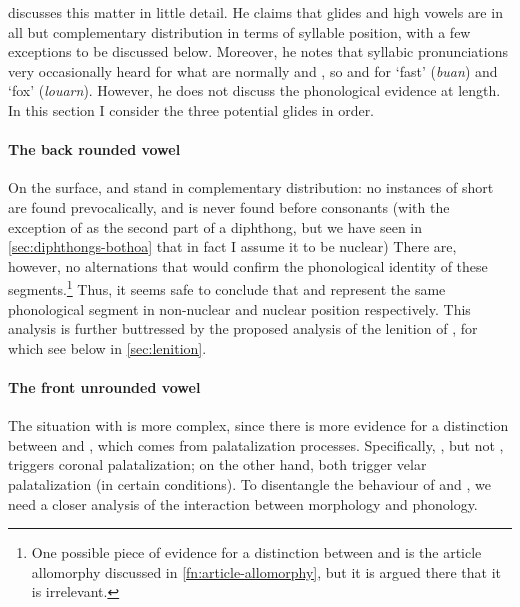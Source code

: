 \citet[p.~166]{humphreys95:_phonol_bothoa_saint_nicol_pelem} discusses this matter in little detail. He claims that glides and high vowels are in all but complementary distribution in terms of syllable position, with a few exceptions to be discussed below. Moreover, he notes that syllabic pronunciations very occasionally heard for what are normally \ipa{[w]} and \ipa{[j]}, so  and  for \ipa{[ˈbjɔ̃ːn]} `fast' (\emph{buan}) and \ipa{[ˈlwarn]} `fox' (\emph{louarn}). However, he does not discuss the phonological evidence at length. In this section I consider the three potential glides in order.

\paragraph{The back rounded vowel}
\label{sec:back-rounded-vowel}

On the surface, \ipa{[w]} and \ipa{[u]} stand in complementary distribution: no instances of short \ipa{[u]} are found prevocalically, and \ipa{[w]} is never found before consonants (with the exception of \ipa{[w]} as the second part of a diphthong, but we have seen in \cref{sec:diphthongs-bothoa} that in fact I assume it to be nuclear) There are, however, no alternations that would confirm the phonological identity of these segments.\footnote{One possible piece of evidence for a distinction between \ipa{[w]} and \ipa{[u]} is the article allomorphy discussed in \cref{fn:article-allomorphy}, but it is argued there that it is irrelevant.} Thus, it seems safe to conclude that \ipa{[w]} and \ipa{[u]} represent the same phonological segment in non-nuclear and nuclear position respectively. This analysis is further buttressed by the proposed analysis of the lenition of \ipa{[ɡw]}, for which see below in \cref{sec:lenition}.

\paragraph{The front unrounded vowel}
\label{sec:front-unro-vowel}

The situation with \ipa{[i]} is more complex, since there is more evidence for a distinction between \ipa{[i]} and \ipa{[j]}, which comes from palatalization processes. Specifically, \ipa{[j]}, but not \ipa{[i]}, triggers coronal palatalization; on the other hand, both trigger velar palatalization (in certain conditions). To disentangle the behaviour of \ipa{[i]} and \ipa{[j]}, we need a closer analysis of the interaction between morphology and phonology.

